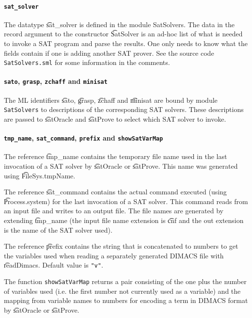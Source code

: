 \paragraph{\tt sat\_solver}${}$\\

The datatype \t{sat\_solver}  is defined in the module {SatSolvers}.
The data in the record argument to the constructor \t{SatSolver}
is an ad-hoc list of what is needed to invoke a SAT program
and parse the results. One only needs to know what the fields
contain if one is adding another SAT prover. See the
source code {\tt SatSolvers.sml} for some information
in the comments.

\paragraph{{\tt sato}, {\tt grasp}, {\tt zchaff} and {\tt minisat}}${}$\\

The ML identifiers \t{sato}, \t{grasp}, \t{zchaff} and \t{minisat} are bound
by module {\tt SatSolvers} to descriptions of the corresponding SAT solvers.
These descriptions are passed to \t{satOracle} and \t{satProve} to
select which SAT solver to invoke.

\paragraph{{\tt tmp\_name}, {\tt sat\_command}, {\tt prefix} and {\tt showSatVarMap}}${}$\\

The reference \t{tmp\_name} contains the temporary file name used in
the last invocation of a SAT solver  by \t{satOracle} or \t{satProve}. This name
was generated using \t{FileSys.tmpName}.

The reference \t{sat\_command} contains the actual command executed
(using \t{Process.system}) for
the last invocation of a SAT solver. This command reads from
an input file and writes to an output file. The file names are generated by extending \t{tmp\_name}
(the input file name extension is \t{cnf} and the out extension is the name of the SAT solver used).

The reference \t{prefix} contains the string that is concatenated to numbers
to get the \HOL{} variables used when reading a separately generated DIMACS file
with \t{readDimacs}. Default value is {\verb+"v"+}.

The function {\small\verb+showSatVarMap+} returns a pair consisting of
the one plus the number of variables used (i.e. the first number not
currently used as a variable) and the mapping from variable names to
numbers for encoding a term in DIMACS format by
\t{satOracle} or \t{satProve}.

